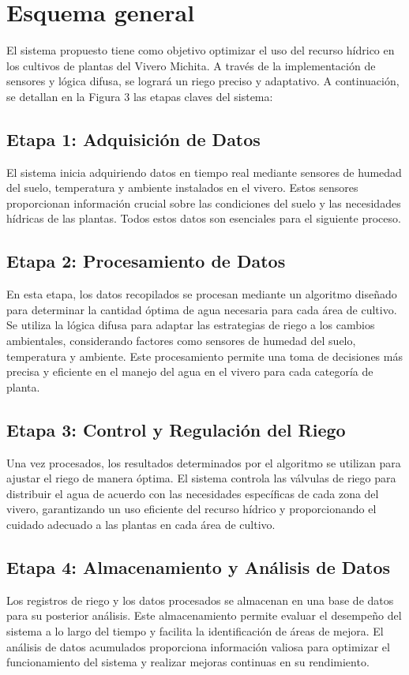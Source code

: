 \section{Esquema general}
El sistema propuesto tiene como objetivo optimizar el uso del recurso hídrico en los cultivos de plantas del Vivero Michita. A través de la implementación de sensores y lógica difusa, se logrará un riego preciso y adaptativo. A continuación, se detallan en la Figura 3 las etapas claves del sistema:


\subsection*{Etapa 1: Adquisición de Datos}
El sistema inicia adquiriendo datos en tiempo real mediante sensores de humedad del suelo, temperatura y ambiente instalados en el vivero. Estos sensores proporcionan información crucial sobre las condiciones del suelo y las necesidades hídricas de las plantas. Todos estos datos son esenciales para el siguiente proceso.

\subsection*{Etapa 2: Procesamiento de Datos}
En esta etapa, los datos recopilados se procesan mediante un algoritmo diseñado para determinar la cantidad óptima de agua necesaria para cada área de cultivo. Se utiliza la lógica difusa para adaptar las estrategias de riego a los cambios ambientales, considerando factores como sensores de humedad del suelo, temperatura y ambiente. Este procesamiento permite una toma de decisiones más precisa y eficiente en el manejo del agua en el vivero para cada categoría de planta.

\subsection*{Etapa 3: Control y Regulación del Riego}
Una vez procesados, los resultados determinados por el algoritmo se utilizan para ajustar el riego de manera óptima. El sistema controla las válvulas de riego para distribuir el agua de acuerdo con las necesidades específicas de cada zona del vivero, garantizando un uso eficiente del recurso hídrico y proporcionando el cuidado adecuado a las plantas en cada área de cultivo.

\subsection*{Etapa 4: Almacenamiento y Análisis de Datos}
Los registros de riego y los datos procesados se almacenan en una base de datos para su posterior análisis. Este almacenamiento permite evaluar el desempeño del sistema a lo largo del tiempo y facilita la identificación de áreas de mejora. El análisis de datos acumulados proporciona información valiosa para optimizar el funcionamiento del sistema y realizar mejoras continuas en su rendimiento.


